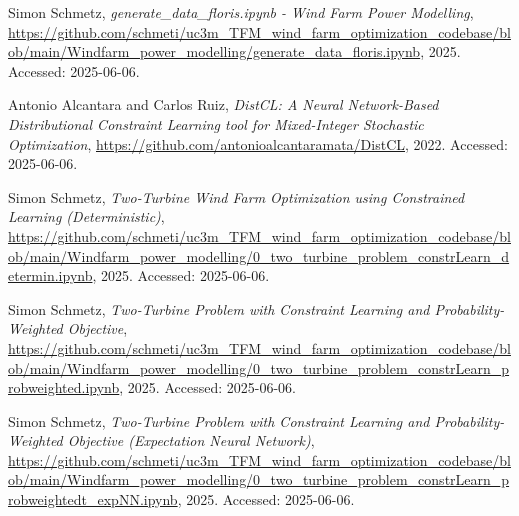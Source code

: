 \documentclass[preprint,12pt]{elsarticle}
\begin{document}
\begin{thebibliography}{00}
Simon Schmetz,
\textit{generate\_data\_floris.ipynb - Wind Farm Power Modelling},
\url{https://github.com/schmeti/uc3m_TFM_wind_farm_optimization_codebase/blob/main/Windfarm_power_modelling/generate_data_floris.ipynb},
2025.
Accessed: 2025-06-06.

Antonio Alcantara and Carlos Ruiz,
\textit{DistCL: A Neural Network-Based Distributional Constraint Learning tool for Mixed-Integer Stochastic Optimization},
\url{https://github.com/antonioalcantaramata/DistCL},
2022.
Accessed: 2025-06-06.

Simon Schmetz,
\textit{Two-Turbine Wind Farm Optimization using Constrained Learning (Deterministic)},
\url{https://github.com/schmeti/uc3m_TFM_wind_farm_optimization_codebase/blob/main/Windfarm_power_modelling/0_two_turbine_problem_constrLearn_determin.ipynb},
2025.
Accessed: 2025-06-06.

Simon Schmetz,
\textit{Two-Turbine Problem with Constraint Learning and Probability-Weighted Objective},
\url{https://github.com/schmeti/uc3m_TFM_wind_farm_optimization_codebase/blob/main/Windfarm_power_modelling/0_two_turbine_problem_constrLearn_probweighted.ipynb},
2025.
Accessed: 2025-06-06.

Simon Schmetz,
\textit{Two-Turbine Problem with Constraint Learning and Probability-Weighted Objective (Expectation Neural Network)},
\url{https://github.com/schmeti/uc3m_TFM_wind_farm_optimization_codebase/blob/main/Windfarm_power_modelling/0_two_turbine_problem_constrLearn_probweightedt_expNN.ipynb},
2025.
Accessed: 2025-06-06.


\end{thebibliography}
\end{document}
